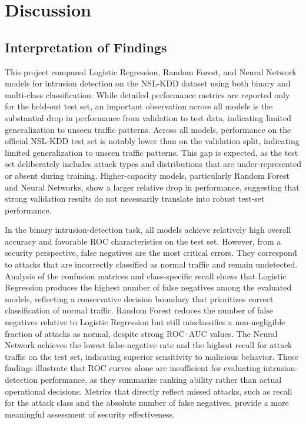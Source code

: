 \chapter{Discussion}
\label{cha:n}
\section{Interpretation of Findings}
This project compared Logistic Regression, Random Forest, and Neural Network models for intrusion detection on the NSL-KDD dataset using both binary and multi-class classification. 
While detailed performance metrics are reported only for the held-out test set, an important observation across all models is the substantial drop in performance from validation to 
test data, indicating limited generalization to unseen traffic patterns. Across all models, performance on the official NSL-KDD test set is notably lower than on the validation split, 
indicating limited generalization to unseen traffic patterns. This gap is expected, as the test set deliberately includes attack types and distributions that are under-represented or 
absent during training. Higher-capacity models, particularly Random Forest and Neural Networks, show a larger relative drop in performance, suggesting that strong validation 
results do not necessarily translate into robust test-set performance.

In the binary intrusion-detection task, all models achieve relatively high overall accuracy and favorable ROC characteristics on the test set. However, from a security perspective, false negatives are the most critical errors. They correspond to attacks that are incorrectly classified as normal traffic and remain undetected. Analysis of the 
confusion matrices and class-specific recall shows that Logistic Regression produces the highest number of false negatives among the evaluated models, reflecting a conservative 
decision boundary that prioritizes correct classification of normal traffic. Random Forest reduces the number of false negatives relative to Logistic Regression but still 
misclassifies a non-negligible fraction of attacks as normal, despite strong ROC--AUC values. The Neural Network achieves the lowest false-negative rate and the highest recall 
for attack traffic on the test set, indicating superior sensitivity to malicious behavior. These findings illustrate that ROC curves alone are insufficient for evaluating 
intrusion-detection performance, as they summarize ranking ability rather than actual operational decisions. Metrics that directly reflect missed attacks, such as recall for the 
attack class and the absolute number of false negatives, provide a more meaningful assessment of security effectiveness.

